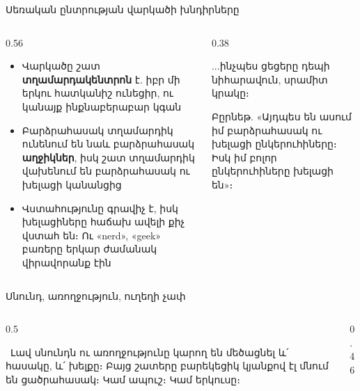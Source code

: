 \begin{frame}{Սեռական ընտրության վարկածի խնդիրները}
  \begin{columns}[T]
    \begin{column}{0.56\textwidth}
      \begin{itemize}
        \item Վարկածը շատ \textbf{տղամարդակենտրոն} է. իբր մի երկու հատկանիշ ունեցիր, ու կանայք ինքնաբերաբար կգան
        \item<2-> Բարձրահասակ տղամարդիկ ունենում են նաև բարձրահասակ \textbf{աղջիկներ}, իսկ շատ տղամարդիկ վախենում են բարձրահասակ ու խելացի կանանցից
        \item<3-> Վստահությունը գրավիչ է, իսկ խելացիները հաճախ ավելի քիչ վստահ են։ Ու «nerd», «geek» բառերը երկար ժամանակ վիրավորանք էին
      \end{itemize}
    \end{column}
    \begin{column}{0.38\textwidth}
      \centering
      \ \par\medskip
      \begin{bookquote}
        ...ինչպես ցեցերը դեպի նիհարավուն, սրամիտ կրակը։
      \end{bookquote}
      {\scriptsize Բըրնեթ. «Այդպես են ասում իմ բարձրահասակ ու խելացի ընկերուհիները։ Իսկ իմ բոլոր ընկերուհիները խելացի են»։\par}
    \end{column}
  \end{columns}
\end{frame}

\begin{frame}{Սնունդ, առողջություն, ուղեղի չափ}
  \begin{columns}[T]
    \begin{column}{0.5\textwidth}
      \begin{card}[colback=mint!35!cardwhite]
        \ Լավ սնունդն ու առողջությունը կարող են մեծացնել և՛ հասակը, և՛ խելքը։ Բայց շատերը բարեկեցիկ կյանքով էլ մնում են ցածրահասակ։ Կամ ապուշ։ Կամ երկուսը։
      \end{card}
    \end{column}
    \begin{column}{0.46\textwidth}
    \end{column}
  \end{columns}
\end{frame}

